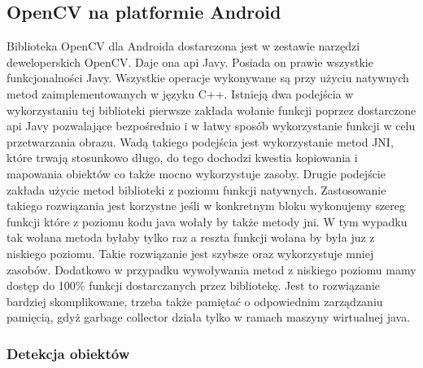 \subsection{OpenCV na platformie Android}

Biblioteka OpenCV dla Androida dostarczona jest w zestawie narzędzi deweloperskich OpenCV. Daje ona api Javy. Posiada on prawie wszystkie funkcjonalności Javy. Wszystkie operacje wykonywane są przy użyciu natywnych metod zaimplementowanych w języku C++. Istnieją dwa podejścia w wykorzystaniu tej biblioteki pierwsze zakłada wołanie funkcji poprzez dostarczone api Javy pozwalające bezpośrednio i w łatwy sposób wykorzystanie funkcji w celu przetwarzania obrazu. Wadą takiego podejścia jest wykorzystanie metod JNI, które trwają stosunkowo długo, do tego dochodzi kwestia kopiowania i mapowania obiektów co także mocno wykorzystuje zasoby. Drugie podejście zakłada użycie metod biblioteki z poziomu funkcji natywnych. Zastosowanie takiego rozwiązania jest korzystne jeśli w konkretnym bloku wykonujemy szereg funkcji które z poziomu kodu java wołały by także metody jni. W tym wypadku tak wołana metoda byłaby tylko raz a reszta funkcji wołana by była juz z niskiego poziomu. Takie rozwiązanie jest szybsze oraz wykorzystuje mniej zasobów. Dodatkowo w przypadku wywoływania metod z niskiego poziomu mamy dostęp do 100\% funkcji dostarczanych przez bibliotekę. Jest to rozwiązanie bardziej skomplikowane, trzeba także pamiętać o odpowiednim zarządzaniu pamięcią, gdyż garbage collector działa tylko w ramach maszyny wirtualnej java.

\subsubsection{Detekcja obiektów}


